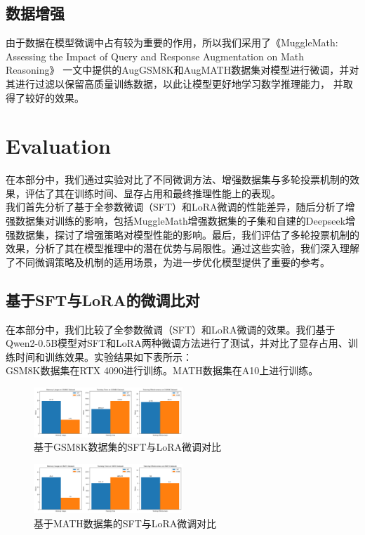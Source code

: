 \documentclass{article}
\begin{document}
\subsection{数据增强}
由于数据在模型微调中占有较为重要的作用，所以我们采用了《MuggleMath: Assessing the Impact of Query and Response Augmentation on Math Reasoning》
一文中提供的AugGSM8K和AugMATH数据集对模型进行微调，并对其进行过滤以保留高质量训练数据，以此让模型更好地学习数学推理能力，
并取得了较好的效果。




\section{Evaluation}

在本部分中，我们通过实验对比了不同微调方法、增强数据集与多轮投票机制的效果，评估了其在训练时间、显存占用和最终推理性能上的表现。\\
我们首先分析了基于全参数微调（SFT）和LoRA微调的性能差异，随后分析了增强数据集对训练的影响，包括MuggleMath增强数据集的子集和自建的Deepseek增强数据集，探讨了增强策略对模型性能的影响。最后，我们评估了多轮投票机制的效果，分析了其在模型推理中的潜在优势与局限性。通过这些实验，我们深入理解了不同微调策略及机制的适用场景，为进一步优化模型提供了重要的参考。

\subsection{基于SFT与LoRA的微调比对}
在本部分中，我们比较了全参数微调（SFT）和LoRA微调的效果。我们基于Qwen2-0.5B模型对SFT和LoRA两种微调方法进行了测试，并对比了显存占用、训练时间和训练效果。实验结果如下表所示：
\\ GSM8K数据集在RTX 4090进行训练。MATH数据集在A10上进行训练。

\begin{figure}[H]
  \centering
  \includegraphics[width=0.5\textwidth]{GSM8K-LORA.png} %
  \caption{基于GSM8K数据集的SFT与LoRA微调对比} %
  \label{fig:my_label0} %
\end{figure}
\begin{figure}[H]
  \centering
  \includegraphics[width=0.5\textwidth]{MATH-LORA.png} %
  \caption{基于MATH数据集的SFT与LoRA微调对比} %
  \label{fig:my_label3} %
\end{figure}
\end{document}
